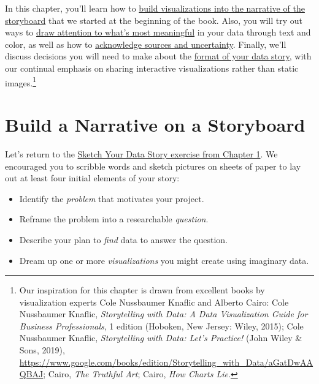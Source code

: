 \documentclass[
  english,
]{book}
\providecommand{\tightlist}{%
  \setlength{\itemsep}{0pt}\setlength{\parskip}{0pt}}
\begin{document}
In this chapter, you'll learn how to \href{storyboard.html}{build visualizations into the narrative of the storyboard} that we started at the beginning of the book. Also, you will try out ways to \href{draw-attention.html}{draw attention to what's most meaningful} in your data through text and color, as well as how to \href{sources-uncertainty.html}{acknowledge sources and uncertainty}. Finally, we'll discuss decisions you will need to make about the \href{story-format.html}{format of your data story}, with our continual emphasis on sharing interactive visualizations rather than static images.\footnote{Our inspiration for this chapter is drawn from excellent books by visualization experts Cole Nussbaumer Knaflic and Alberto Cairo: Cole Nussbaumer Knaflic, \emph{Storytelling with {Data}: {A Data Visualization Guide} for {Business Professionals}}, 1 edition ({Hoboken, New Jersey}: {Wiley}, 2015); Cole Nussbaumer Knaflic, \emph{Storytelling with {Data}: {Let}'s {Practice}!} ({John Wiley \& Sons}, 2019), \url{https://www.google.com/books/edition/Storytelling_with_Data/aGatDwAAQBAJ}; Cairo, \emph{The {Truthful Art}}; Cairo, \emph{How {Charts Lie}}.}

\hypertarget{storyboard}{%
\section*{Build a Narrative on a Storyboard}\label{storyboard}}

Let's return to the \href{sketch.html}{Sketch Your Data Story exercise from Chapter 1}. We encouraged you to scribble words and sketch pictures on sheets of paper to lay out at least four initial elements of your story:

\begin{itemize}
\tightlist
\item
  Identify the \emph{problem} that motivates your project.
\item
  Reframe the problem into a researchable \emph{question}.
\item
  Describe your plan to \emph{find} data to answer the question.
\item
  Dream up one or more \emph{visualizations} you might create using imaginary data.
\end{itemize}
\end{document}
